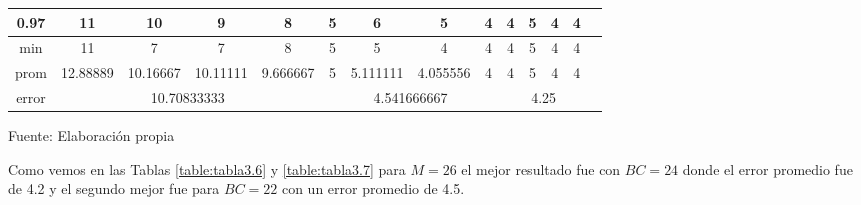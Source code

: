 \begin{center}
\begin{table}[H]
{\begin{tabular}{|c|c|c|c|c|c|c|c|c|c|c|c|c|c|}
\hline 
0.97 & 
11 & 10 & 9 & 8 & 5 & 6 & 5 & 4 & 4 & 5 & 4 & 4 \\
\hline 
min & 
11 & 7 & 7 & 8 & 5 & 5 & 4 & 4 & 4 & 5 & 4 & 4 \\
\hline 
prom & 
12.88889 & 10.16667 & 10.11111 & 9.666667 & 5 & 5.111111 & 4.055556 & 4 & 4 & 5 & 4 & 4 \\
\hline 
error & 
\multicolumn{4}{c|}{10.70833333} & 
\multicolumn{4}{c|}{4.541666667} & 
\multicolumn{4}{c|}{4.25}\\ 
\hline 
\end{tabular} 
}
\begin{center}
\vskip 0.2cm
{\small{Fuente: Elaboración propia}}
\end{center}
\end{table}
\end{center}

\vskip -0.5cm
Como vemos en las Tablas \ref{table:tabla3.6} y \ref{table:tabla3.7} para $M = 26$ el mejor resultado fue con $BC = 24$ donde el error promedio fue de 4.2 y el segundo mejor fue para $BC = 22$ con un error promedio de 4.5.
\vskip -0.5cm

